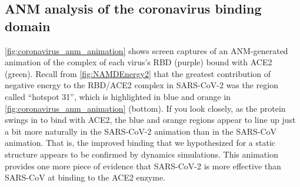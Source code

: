 %
%
%

\FloatBarrier
{}
\subsection{ANM analysis of the coronavirus binding domain}

\autoref{fig:coronavirus_anm_animation} shows screen captures of an ANM-generated animation of the complex of each virus's RBD (purple) bound with ACE2 (green). Recall from \autoref{fig:NAMDEnergy2} that the greatest contribution of negative energy to the RBD/ACE2 complex in SARS-CoV-2 was the region called ``hotspot 31'', which is highlighted in blue and orange in \autoref{fig:coronavirus_anm_animation} (bottom). If you look closely, as the protein swings in to bind with ACE2, the blue and orange regions appear to line up just a bit more naturally in the SARS-CoV-2 animation than in the SARS-CoV animation. That is, the improved binding that we hypothesized for a static structure appears to be confirmed by dynamics simulations. This animation provides one more piece of evidence that SARS-CoV-2 is more effective than SARS-CoV at binding to the ACE2 enzyme.\\

